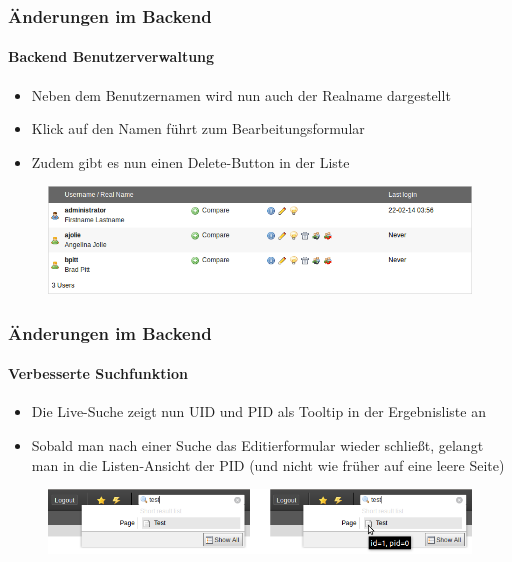 
\begin{frame}[fragile]
	\frametitle{Änderungen im Backend}
	\framesubtitle{Backend Benutzerverwaltung}

	\begin{itemize}
		\item Neben dem Benutzernamen wird nun auch der Realname dargestellt
		\item Klick auf den Namen führt zum Bearbeitungsformular
		\item Zudem gibt es nun einen Delete-Button in der Liste
	\end{itemize}

	\begin{figure}
		\includegraphics[width=0.95\linewidth]{Images/BackendChanges/BackendUserList.png}
	\end{figure}

\end{frame}


\begin{frame}[fragile]
	\frametitle{Änderungen im Backend}
	\framesubtitle{Verbesserte Suchfunktion}

	\begin{itemize}
		\item Die Live-Suche zeigt nun UID und PID als Tooltip in der Ergebnisliste an
		\item Sobald man nach einer Suche das Editierformular wieder schließt, gelangt man in die Listen-Ansicht der PID (und nicht wie früher auf eine leere Seite)
	\end{itemize}

	\begin{figure}
		\includegraphics[width=0.8\linewidth]{Images/BackendChanges/LiveSearchTooltip.png}
	\end{figure}

\end{frame}

